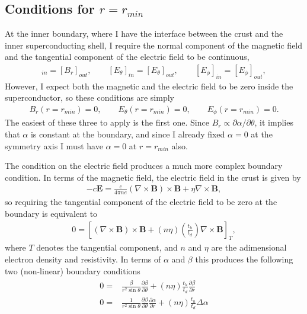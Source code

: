 \documentclass[letterpaper,10pt]{article}
\newcommand{\pp}{\partial}
\renewcommand{\vec}[1]{\boldsymbol#1}
\begin{document}
\subsection{Conditions for $r=r_{min}$}
At the inner boundary, where I have the interface between the crust and the inner superconducting shell, I require the normal component of the magnetic field and the tangential component of the electric field to be continuous,
\begin{eqnarray}
[B_r]_{in}=[B_r]_{out},\qquad [E_{\theta}]_{in}=[E_{\theta}]_{out},\qquad [E_{\phi}]_{in}=[E_{\phi}]_{out},
\end{eqnarray}
However, I expect both the magnetic and the electric field to be zero inside the superconductor, so these conditions are simply
\begin{eqnarray}
B_r(r=r_{min})=0,\qquad E_{\theta}(r=r_{min})=0,\qquad E_{\phi}(r=r_{min})=0.
\end{eqnarray}
The easiest of these three to apply is the first one. Since $B_r\propto \pp\alpha/\pp\theta$, it implies that $\alpha$ is constant at the boundary, and since I already fixed $\alpha=0$ at the symmetry axis I must have $\alpha=0$ at  $r=r_{min}$ also.

The condition on the electric field produces a much more complex boundary condition. In terms of the magnetic field, the electric field in the crust is given by
\begin{eqnarray}
-c\vec{E}=\frac{c}{4\pi n e}(\nabla\times\vec{B})\times\vec{B}+\eta\nabla\times\vec{B},
\end{eqnarray}
so requiring the tangential component of the electric field to be zero at the boundary is equivalent to
\begin{eqnarray}
0=\left[(\nabla\times\vec{B})\times\vec{B}+(n\eta)\left(\frac{t_h}{t_d}\right)\nabla\times\vec{B}\right]_T,
\end{eqnarray}
where $T$ denotes the tangential component, and $n$ and $\eta$ are the adimensional electron density and resistivity. In terms of $\alpha$ and $\beta$ this produces the following two (non-linear) boundary conditions
\begin{eqnarray}
\begin{aligned}
0=&\frac{\beta}{r^2\sin\theta}\frac{\pp\beta}{\pp\theta}+(n\eta)\frac{t_h}{t_d}\frac{\pp\beta}{\pp r}\\
0=&\frac{1}{r^2\sin\theta}\frac{\pp\beta}{\pp\theta}\frac{\pp\alpha}{\pp r}+(n\eta)\frac{t_h}{t_d}\Delta\alpha
\end{aligned}
\end{eqnarray}
\end{document}
